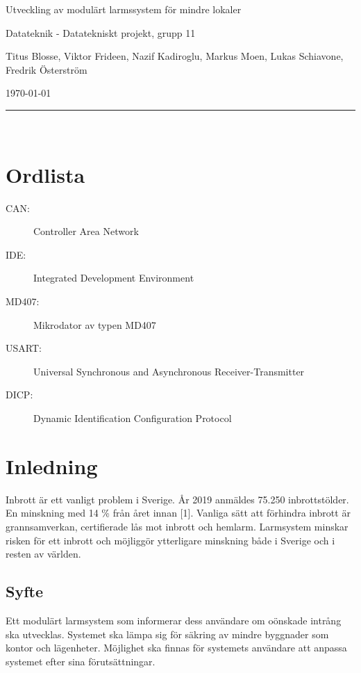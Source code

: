 \documentclass[a4paper]{article}
\begin{document}
\thispagestyle{empty}

\begin{center}
    \parskip=14pt
    \vspace*{3\parskip}

    {\LARGE Utveckling av modulärt larmssystem för mindre lokaler}

    {\large Datateknik - Datatekniskt projekt, grupp 11

    Titus Blosse, Viktor Frideen, Nazif Kadiroglu, Markus Moen, Lukas Schiavone, Fredrik Österström

    \today}

    \rule{7cm}{0.4pt}\\
\end{center}
\newpage

\thispagestyle{empty}

\tableofcontents
\newpage

\thispagestyle{empty}

\section*{Ordlista}

\begin{description}
    \item[CAN:] Controller Area Network
    \item[IDE:] Integrated Development Environment
    \item[MD407:] Mikrodator av typen MD407
    \item[USART:] Universal Synchronous and Asynchronous Receiver-Transmitter
    \item[DICP:] Dynamic Identification Configuration Protocol
\end{description}
\newpage


\section{Inledning}
Inbrott är ett vanligt problem i Sverige.
År 2019 anmäldes 75.250 inbrottstölder.
En minskning med 14 \% från året innan [1].
Vanliga sätt att förhindra inbrott är grannsamverkan, certifierade lås mot inbrott och hemlarm.
Larmsystem minskar risken för ett inbrott och möjliggör ytterligare minskning både i Sverige och i resten av världen.

\subsection{Syfte}
Ett modulärt larmsystem som informerar dess användare om oönskade intrång ska utvecklas.
Systemet ska lämpa sig för säkring av mindre byggnader som kontor och lägenheter.
Möjlighet ska finnas för systemets användare att anpassa systemet efter sina förutsättningar.
\end{document}
